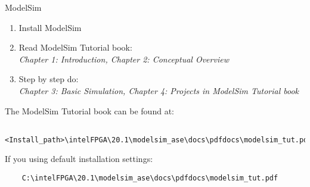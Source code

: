 \documentclass{vhdl-assignment}
\begin{document}
\begin{problem}{ModelSim}
    \begin{enumerate}
        \item Install ModelSim
        \item Read ModelSim Tutorial book: \\
        \emph{Chapter 1: Introduction, Chapter 2: Conceptual Overview}
        \item Step by step do: \\
        \emph{Chapter 3: Basic Simulation, Chapter 4: Projects in ModelSim Tutorial book}
    \end{enumerate}

The ModelSim Tutorial book can be found at:

\begin{verbatim}
    <Install_path>\intelFPGA\20.1\modelsim_ase\docs\pdfdocs\modelsim_tut.pdf
\end{verbatim}

If you using default installation settings:

\begin{verbatim}
    C:\intelFPGA\20.1\modelsim_ase\docs\pdfdocs\modelsim_tut.pdf
\end{verbatim}

\end{problem}
\end{document}

